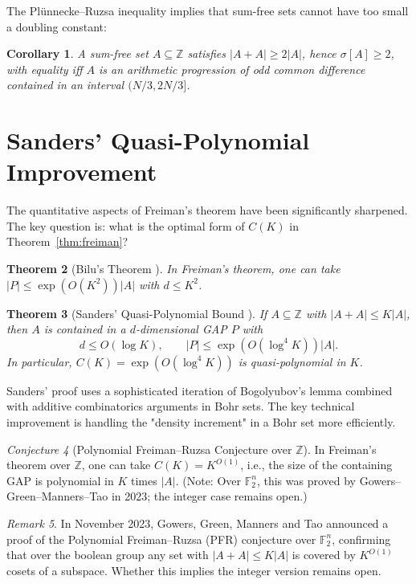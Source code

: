 \documentclass[12pt,a4paper]{amsart}
\newtheorem{theorem}{Theorem}[section]
\newtheorem{corollary}[theorem]{Corollary}
\theoremstyle{definition}
\theoremstyle{remark}
\newtheorem{remark}[theorem]{Remark}
\newtheorem{conjecture}[theorem]{Conjecture}
\newcommand{\F}{\mathbb{F}}
\newcommand{\Z}{\mathbb{Z}}
\begin{document}
The Plünnecke--Ruzsa inequality implies that sum-free sets cannot have too small
a doubling constant:

\begin{corollary}
A sum-free set $A \subseteq \Z$ satisfies $|A + A| \geq 2|A|$, hence
$\sigma[A] \geq 2$, with equality iff $A$ is an arithmetic progression of odd
common difference contained in an interval $(N/3, 2N/3]$.
\end{corollary}

\section{Sanders' Quasi-Polynomial Improvement}\label{sec:sanders}

The quantitative aspects of Freiman's theorem have been significantly sharpened.
The key question is: what is the optimal form of $C(K)$ in Theorem~\ref{thm:freiman}?

\begin{theorem}[Bilu's Theorem \cite{Bilu1999}]\label{thm:bilu}
In Freiman's theorem, one can take $|P| \leq \exp(O(K^2)) |A|$ with $d \leq K^2$.
\end{theorem}

\begin{theorem}[Sanders' Quasi-Polynomial Bound \cite{Sanders2012}]\label{thm:sanders}
If $A \subseteq \Z$ with $|A + A| \leq K|A|$, then $A$ is contained in a
$d$-dimensional GAP $P$ with
\[
  d \leq O(\log K), \qquad |P| \leq \exp(O(\log^4 K)) |A|.
\]
In particular, $C(K) = \exp(O(\log^4 K))$ is quasi-polynomial in $K$.
\end{theorem}

Sanders' proof uses a sophisticated iteration of Bogolyubov's lemma combined with
additive combinatorics arguments in Bohr sets. The key technical improvement is
handling the "density increment" in a Bohr set more efficiently.

\begin{conjecture}[Polynomial Freiman--Ruzsa Conjecture over $\Z$]\label{conj:pfr}
In Freiman's theorem over $\Z$, one can take $C(K) = K^{O(1)}$, i.e., the size of the
containing GAP is polynomial in $K$ times $|A|$. (Note: Over $\F_2^n$, this was
proved by Gowers--Green--Manners--Tao in 2023; the integer case remains open.)
\end{conjecture}

\begin{remark}
In November 2023, Gowers, Green, Manners and Tao \cite{GowersTao2023} announced a
proof of the Polynomial Freiman--Ruzsa (PFR) conjecture over $\F_2^n$, confirming
that over the boolean group any set with $|A+A| \leq K|A|$ is covered by $K^{O(1)}$
cosets of a subspace. Whether this implies the integer version remains open.
\end{remark}
\end{document}

